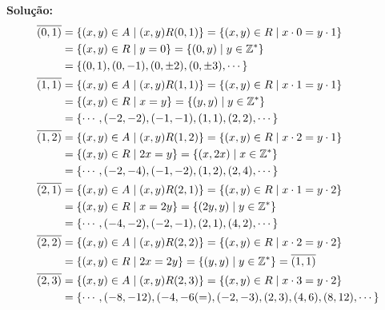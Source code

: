 \documentclass[12pt]{article}
\begin{document}
\begin{enumerate}[label={\alph*})]
\noindent\textbf{Solu\c{c}\~ao:}
\begin{align*}
	\overline{(0,1)} &= \{ (x, y) \in A \mid (x,y)R(0,1)\} = \{ (x,y) \in R \mid x\cdot 0 = y\cdot 1\} \\ &= \{ (x,y) \in R \mid y = 0 \} = \{(0, y) \mid y \in \mathbb{Z}^*\} \\ &= \{ (0,1), (0,-1), (0,\pm 2) , (0, \pm 3), \cdots\}\\
	\overline{(1,1)} &= \{ (x, y) \in A \mid (x,y)R(1,1)\} = \{ (x,y) \in R \mid x\cdot 1 = y\cdot 1\} \\ &= \{ (x,y) \in R \mid x = y \} = \{(y, y) \mid y \in \mathbb{Z}^*\} \\ &= \{\cdots, (-2,-2), (-1,-1), (1,1), (2,2),\cdots\}\\
	\overline{(1,2)} &= \{ (x, y) \in A \mid (x,y)R(1,2)\} = \{ (x,y) \in R \mid x\cdot 2 = y\cdot 1\} \\ &= \{ (x,y) \in R \mid 2x = y \} = \{(x, 2x) \mid x \in \mathbb{Z}^*\} \\ &= \{\cdots, (-2,-4), (-1,-2), (1,2), (2,4), \cdots\}\\
	\overline{(2,1)} &= \{ (x, y) \in A \mid (x,y)R(2,1)\} = \{ (x,y) \in R \mid x\cdot 1 = y\cdot 2\} \\ &= \{ (x,y) \in R \mid x = 2y \} = \{(2y, y) \mid y \in \mathbb{Z}^*\} \\ &= \{\cdots, (-4,-2), (-2,-1), (2,1), (4,2), \cdots\}\\
	\overline{(2,2)} &= \{ (x, y) \in A \mid (x,y)R(2,2)\} = \{ (x,y) \in R \mid x\cdot 2 = y\cdot 2\} \\ &= \{ (x,y) \in R \mid 2x = 2y \} = \{(y, y) \mid y \in \mathbb{Z}^*\} = \overline{(1,1)}\\
	\overline{(2,3)} &= \{ (x, y) \in A \mid (x,y)R(2,3)\} = \{ (x,y) \in R \mid x\cdot 3 = y\cdot 2\} \\ &= \{ \cdots,(-8,-12),(-4,-6(=),(-2,-3), (2,3), (4,6), (8,12), \cdots\}
\end{align*}
\end{enumerate}
\end{document}

